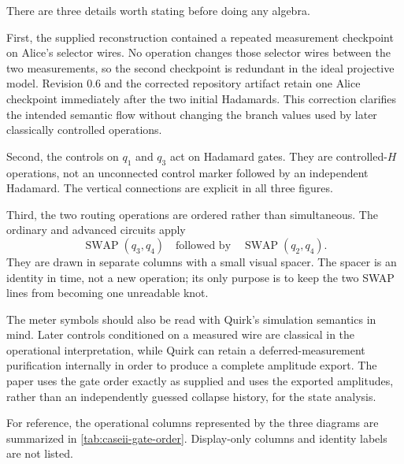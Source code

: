 There are three details worth stating before doing any algebra.

First, the supplied reconstruction contained a repeated measurement checkpoint
on Alice's selector wires. No operation changes those selector wires between
the two measurements, so the second checkpoint is redundant in the ideal
projective model. Revision 0.6 and the corrected repository artifact retain one
Alice checkpoint immediately after the two initial Hadamards. This correction
clarifies the intended semantic flow without changing the branch values used by
later classically controlled operations.

Second, the controls on $q_1$ and $q_3$ act on Hadamard gates. They are
controlled-$H$ operations, not an unconnected control marker followed by an
independent Hadamard. The vertical connections are explicit in all three
figures.

Third, the two routing operations are ordered rather than simultaneous. The
ordinary and advanced circuits apply
\begin{equation}
  \operatorname{SWAP}(q_3,q_4)
  \quad\text{followed by}\quad
  \operatorname{SWAP}(q_2,q_4).
  \label{eq:caseii-swap-order}
\end{equation}
They are drawn in separate columns with a small visual spacer. The spacer is an
identity in time, not a new operation; its only purpose is to keep the two SWAP
lines from becoming one unreadable knot.

The meter symbols should also be read with Quirk's simulation semantics in
mind. Later controls conditioned on a measured wire are classical in the
operational interpretation, while Quirk can retain a deferred-measurement
purification internally in order to produce a complete amplitude export. The
paper uses the gate order exactly as supplied and uses the exported amplitudes,
rather than an independently guessed collapse history, for the state analysis.



For reference, the operational columns represented by the three diagrams are
summarized in \cref{tab:caseii-gate-order}. Display-only columns and identity
labels are not listed.

